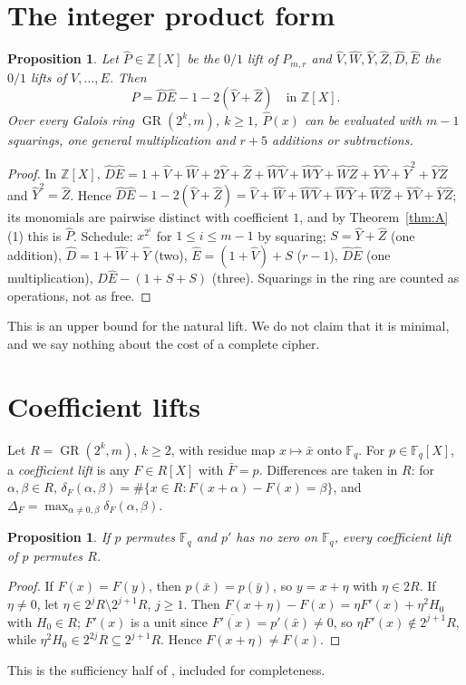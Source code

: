\documentclass[preprint,12pt]{elsarticle}
\newtheorem{proposition}[theorem]{Proposition}
\theoremstyle{definition}
\newcommand{\F}{\mathbb{F}}
\newcommand{\Z}{\mathbb{Z}}
\newcommand{\GR}{\operatorname{GR}}
\begin{document}
\section{The integer product form}\label{sec:C}
\begin{proposition}\label{prop:C}
Let $\hat P\in\Z[X]$ be the $0/1$ lift of $P_{m,r}$ and $\hat V,\hat W,\hat Y,\hat Z,\hat D,\hat E$ the $0/1$ lifts of $V,\dots,E$. Then
\[
\hat P=\hat D\hat E-1-2(\hat Y+\hat Z)\quad\text{in }\Z[X].
\]
Over every Galois ring $\GR(2^k,m)$, $k\ge1$, $\hat P(x)$ can be evaluated with $m-1$ squarings, one general multiplication and $r+5$ additions or subtractions.
\end{proposition}
\begin{proof}
In $\Z[X]$, $\hat D\hat E=1+\hat V+\hat W+2\hat Y+\hat Z+\hat W\hat V+\hat W\hat Y+\hat W\hat Z+\hat Y\hat V+\hat Y^2+\hat Y\hat Z$ and $\hat Y^2=\hat Z$. Hence $\hat D\hat E-1-2(\hat Y+\hat Z)=\hat V+\hat W+\hat W\hat V+\hat W\hat Y+\hat W\hat Z+\hat Y\hat V+\hat Y\hat Z$; its monomials are pairwise distinct with coefficient $1$, and by Theorem~\ref{thm:A}(1) this is $\hat P$. Schedule: $x^{2^i}$ for $1\le i\le m-1$ by squaring; $S=\hat Y+\hat Z$ (one addition), $\hat D=1+\hat W+\hat Y$ (two), $\hat E=(1+\hat V)+S$ ($r-1$), $\hat D\hat E$ (one multiplication), $\hat D\hat E-(1+S+S)$ (three). Squarings in the ring are counted as operations, not as free.
\end{proof}
This is an upper bound for the natural lift. We do not claim that it is minimal, and we say nothing about the cost of a complete cipher.

\section{Coefficient lifts}\label{sec:ring}
Let $R=\GR(2^k,m)$, $k\ge2$, with residue map $x\mapsto\bar x$ onto $\F_q$. For $p\in\F_q[X]$, a \emph{coefficient lift} is any $F\in R[X]$ with $\bar F=p$. Differences are taken in $R$: for $\alpha,\beta\in R$, $\delta_F(\alpha,\beta)=\#\{x\in R:F(x+\alpha)-F(x)=\beta\}$, and $\Delta_F=\max_{\alpha\ne0,\beta}\delta_F(\alpha,\beta)$.

\begin{proposition}\label{prop:lift}
If $p$ permutes $\F_q$ and $p'$ has no zero on $\F_q$, every coefficient lift of $p$ permutes $R$.
\end{proposition}
\begin{proof}
If $F(x)=F(y)$, then $p(\bar x)=p(\bar y)$, so $y=x+\eta$ with $\eta\in2R$. If $\eta\neq0$, let $\eta\in2^jR\setminus2^{j+1}R$, $j\ge1$. Then $F(x+\eta)-F(x)=\eta F'(x)+\eta^2H_0$ with $H_0\in R$; $F'(x)$ is a unit since $\overline{F'(x)}=p'(\bar x)\ne0$, so $\eta F'(x)\notin2^{j+1}R$, while $\eta^2H_0\in2^{2j}R\subseteq2^{j+1}R$. Hence $F(x+\eta)\ne F(x)$.
\end{proof}
This is the sufficiency half of \cite[Thm.~2]{RS}, included for completeness.
\end{document}
